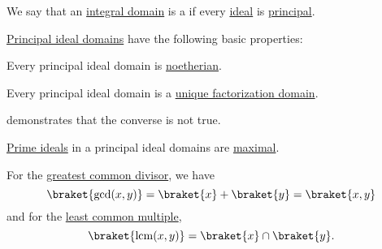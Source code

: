 \begin{definition}\label{def:principal_ideal_domain}
  We say that an \hyperref[def:integral_domain]{integral domain} is a  if every \hyperref[def:semiring_ideal]{ideal} is \hyperref[def:semiring_ideal/principal]{principal}.
\end{definition}

\begin{proposition}\label{thm:def:principal_ideal_domain}
  \hyperref[def:principal_ideal_domain]{Principal ideal domains} have the following basic properties:
  \begin{thmenum}
     Every principal ideal domain is \hyperref[def:noetherian_semiring]{noetherian}.

     Every principal ideal domain is a \hyperref[def:unique_factorization_domain]{unique factorization domain}.

     demonstrates that the converse is not true.

     \hyperref[def:semiring_ideal/prime]{Prime ideals} in a principal ideal domains are \hyperref[def:semiring_ideal/maximal]{maximal}.

     For the \hyperref[def:gcd_and_lcm]{greatest common divisor}, we have
    \begin{equation*}
      \braket{ \gcd(x, y) } = \braket{ x } + \braket{ y } = \braket{ x, y }
    \end{equation*}
    and for the \hyperref[def:gcd_and_lcm]{least common multiple},
    \begin{equation*}
      \braket{ \lcm(x, y) } = \braket{ x } \cap \braket{ y }.
    \end{equation*}
  \end{thmenum}
\end{proposition}
